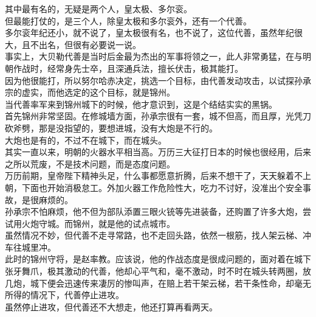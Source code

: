 \begin{multicols}{\theparacolNo}
其中最有名的，无疑是两个人，皇太极、多尔衮。\\

但最能打仗的，是三个人，除皇太极和多尔衮外，还有一个代善。\\

多尔衮年纪还小，就不说了，皇太极很有名，也不说了，这位代善，虽然年纪很大，且不出名，但很有必要说一说。\\

事实上，大贝勒代善是当时后金最为杰出的军事将领之一，此人非常勇猛，在与明朝作战时，经常身先士卒，且深通兵法，擅长伏击，极其能打。\\

因为他很能打，所以努尔哈赤决定，挑选一个目标，由代善发动攻击，以试探孙承宗的虚实，而他选定的这个目标，就是锦州。\\

当代善率军来到锦州城下的时候，他才意识到，这是个结结实实的黑锅。\\

首先锦州非常坚固。在修城墙方面，孙承宗很有一套，城不但高，而且厚，光凭刀砍斧劈，那是没指望的，要想进城，没有大炮是不行的。\\

大炮也是有的，不过不在城下，而在城头。\\

其实一直以来，明朝的火器水平相当高。万历三大征打日本的时候也很经用，后来之所以荒废，不是技术问题，而是态度问题。\\

万历前期，皇帝陛下精神头足，什么事都愿意折腾，后来不想干了，天天躲着不上朝，下面也开始消极怠工。外加火器工作危险性大，吃力不讨好，没准出个安全事故，是很麻烦的。\\

孙承宗不怕麻烦，他不但为部队添置三眼火铳等先进装备，还购置了许多大炮，尝试用火炮守城。而锦州，就是他的试点城市。\\

虽然情况不妙，但代善不走寻常路，也不走回头路，依然一根筋，找人架云梯、冲车往城里冲。\\

此时的锦州守将，是赵率教。应该说，他的作战态度是很成问题的，面对着在城下张牙舞爪，极其激动的代善，他却心平气和，毫不激动，时不时在城头转两圈，放几炮，城下便会迅速传来凄厉的惨叫声，在赔上若干架云梯，若干条性命，却毫无所得的情况下，代善停止进攻。\\

虽然停止进攻，但代善还不大想走，他还打算再看两天。\\


\end{multicols}
